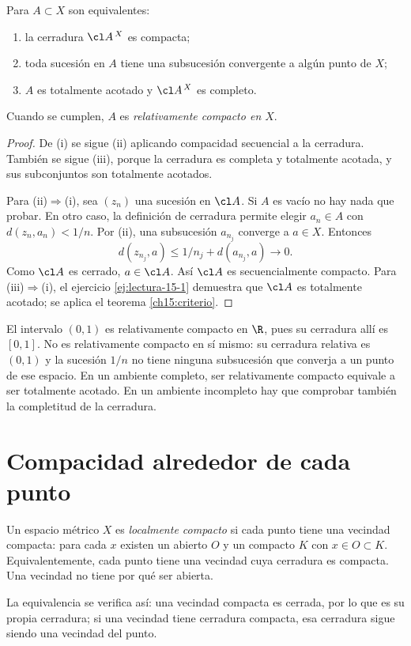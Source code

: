\begin{proposicion}\label{ch15:relativa}
Para $A\subset X$ son equivalentes:
\begin{enumerate}[label=(\roman*)]
\item la cerradura $\cl A^{\,X}$ es compacta;
\item toda sucesión en $A$ tiene una subsucesión convergente a algún punto de $X$;
\item $A$ es totalmente acotado y $\cl A^{\,X}$ es completo.
\end{enumerate}
Cuando se cumplen, $A$ es \emph{relativamente compacto en $X$}.
\end{proposicion}
\begin{proof}
De (i) se sigue (ii) aplicando compacidad secuencial a la cerradura. También se sigue (iii), porque la cerradura es completa y totalmente acotada, y sus subconjuntos son totalmente acotados.

Para (ii)$\Rightarrow$(i), sea $(z_n)$ una sucesión en $\cl A$. Si $A$ es vacío no hay nada que probar. En otro caso, la definición de cerradura permite elegir $a_n\in A$ con $d(z_n,a_n)<1/n$. Por (ii), una subsucesión $a_{n_j}$ converge a $a\in X$. Entonces
\[
d(z_{n_j},a)\le 1/n_j+d(a_{n_j},a)\longrightarrow0.
\]
Como $\cl A$ es cerrado, $a\in\cl A$. Así $\cl A$ es secuencialmente compacto. Para (iii)$\Rightarrow$(i), el ejercicio \ref{ej:lectura-15-1} demuestra que $\cl A$ es totalmente acotado; se aplica el teorema \ref{ch15:criterio}.
\end{proof}

\begin{ejemplo}
El intervalo $(0,1)$ es relativamente compacto en $\R$, pues su cerradura allí es $[0,1]$. No es relativamente compacto en sí mismo: su cerradura relativa es $(0,1)$ y la sucesión $1/n$ no tiene ninguna subsucesión que converja a un punto de ese espacio. En un ambiente completo, ser relativamente compacto equivale a ser totalmente acotado. En un ambiente incompleto hay que comprobar también la completitud de la cerradura.
\end{ejemplo}

\section{Compacidad alrededor de cada punto}
\begin{definicion}
Un espacio métrico $X$ es \emph{localmente compacto} si cada punto tiene una vecindad compacta: para cada $x$ existen un abierto $O$ y un compacto $K$ con $x\in O\subset K$. Equivalentemente, cada punto tiene una vecindad cuya cerradura es compacta. Una vecindad no tiene por qué ser abierta.
\end{definicion}
La equivalencia se verifica así: una vecindad compacta es cerrada, por lo que es su propia cerradura; si una vecindad tiene cerradura compacta, esa cerradura sigue siendo una vecindad del punto.


